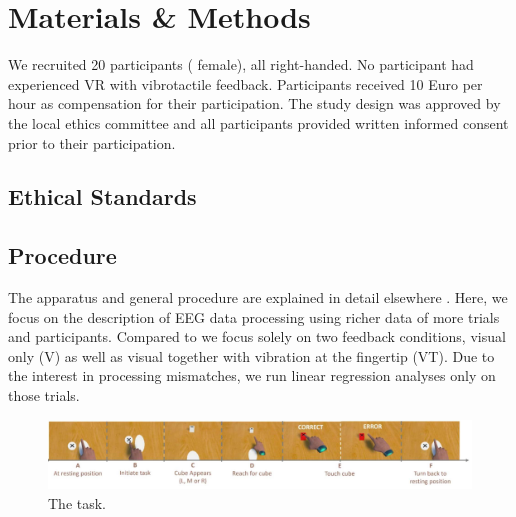 \section{Materials \& Methods}

We recruited 20 participants ( female), all right-handed. No participant had experienced VR with vibrotactile feedback. Participants received 10 Euro per hour as compensation for their participation. The study design was approved by the local ethics committee and all participants provided written informed consent prior to their participation. 

\subsection{Ethical Standards}

\subsection{Procedure}
The apparatus and general procedure are explained in detail elsewhere \citep{Gehrke_2019}. Here, we focus on the description of EEG data processing using richer data of more trials and participants. Compared to \citep{Gehrke_2019} we focus solely on two feedback conditions, visual only (V) as well as visual together with vibration at the fingertip (VT). Due to the interest in processing mismatches, we run linear regression analyses only on those trials.

\begin{figure}[h]
\centering
\includegraphics[width=\linewidth]{figures/task_setup.png}
\caption{The task.}
\end{figure}